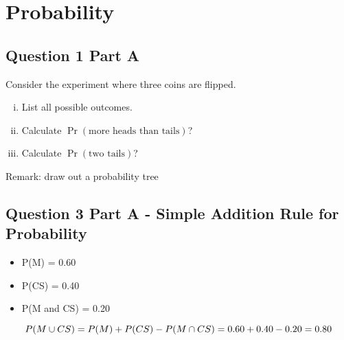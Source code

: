 \documentclass[]{report}
\begin{document}
%
%
%
%
%
%
%
%








\section*{Probability}
\subsection*{Question 1 Part A}

Consider the experiment where three coins are flipped. \\[-0.2cm]
\begin{enumerate}[(i)]
\item List all possible outcomes. \item  Calculate $\Pr(\text{more heads than tails})$? \item Calculate $\Pr(\text{two tails})$?
\end{enumerate}
Remark: draw out a probability tree


























\subsection*{Question 3 Part A - Simple Addition Rule for Probability}

\begin{itemize}
\item P(M) = 0.60
\item P(CS) = 0.40
\item P(M and CS) = 0.20
\end{itemize}
\[  P(M \cup CS) = P(M) + P(CS) - P(M \cap CS) 
\\
= 0.60 + 0.40 -0.20 
= 0.80
\] 
\end{document}
